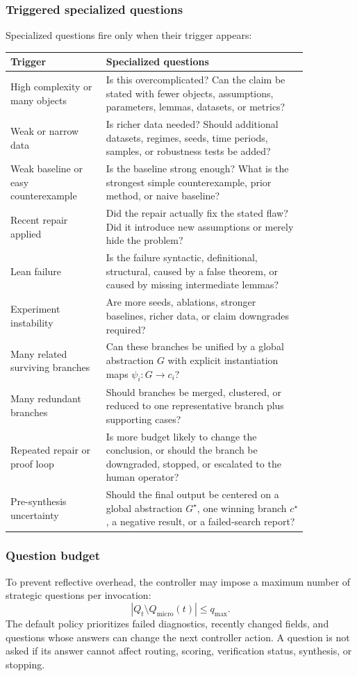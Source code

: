 \documentclass[11pt]{article}
\begin{document}
\subsubsection*{Triggered specialized questions}
Specialized questions fire only when their trigger appears:
\begin{center}
\begin{tabular}{p{0.27\linewidth} p{0.58\linewidth}}
\toprule
Trigger & Specialized questions \\
\midrule
High complexity or many objects & Is this overcomplicated? Can the claim be stated with fewer objects, assumptions, parameters, lemmas, datasets, or metrics? \\
Weak or narrow data & Is richer data needed? Should additional datasets, regimes, seeds, time periods, samples, or robustness tests be added? \\
Weak baseline or easy counterexample & Is the baseline strong enough? What is the strongest simple counterexample, prior method, or naive baseline? \\
Recent repair applied & Did the repair actually fix the stated flaw? Did it introduce new assumptions or merely hide the problem? \\
Lean failure & Is the failure syntactic, definitional, structural, caused by a false theorem, or caused by missing intermediate lemmas? \\
Experiment instability & Are more seeds, ablations, stronger baselines, richer data, or claim downgrades required? \\
Many related surviving branches & Can these branches be unified by a global abstraction $G$ with explicit instantiation maps $\psi_i:G\to c_i$? \\
Many redundant branches & Should branches be merged, clustered, or reduced to one representative branch plus supporting cases? \\
Repeated repair or proof loop & Is more budget likely to change the conclusion, or should the branch be downgraded, stopped, or escalated to the human operator? \\
Pre-synthesis uncertainty & Should the final output be centered on a global abstraction $G^\star$, one winning branch $c^\star$, a negative result, or a failed-search report? \\
\bottomrule
\end{tabular}
\end{center}

\subsubsection*{Question budget}
To prevent reflective overhead, the controller may impose a maximum number of strategic questions per invocation:
$$
|Q_t\setminus Q_{\mathrm{micro}}(t)|\leq q_{\max}.
$$
The default policy prioritizes failed diagnostics, recently changed fields, and questions whose answers can change the next controller action. A question is not asked if its answer cannot affect routing, scoring, verification status, synthesis, or stopping.
\end{document}
